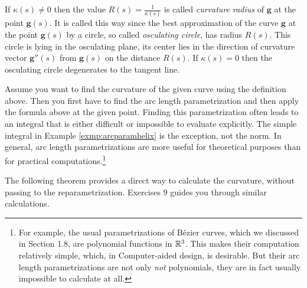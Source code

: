 If $\kappa(s)\ne 0$ then the value $R(s)=\tfrac1{\kappa(s)}$
is called \emph{curvature radius} of $\textbf{g}$ at the point $\textbf{g}(s)$. 
It is called this way since the best approximation of the curve $\textbf{g}$ at the point $\textbf{g}(s)$ by a circle, so called \emph{osculating circle}, has radius $R(s)$.
This circle is lying in the osculating plane,
its center lies in the direction of curvature vector $\textbf{g}''(s)$ from $\textbf{g}(s)$ on the distance $R(s)$.
If $\kappa(s)=0$ then the osculating circle degenerates to the tangent line.

Assume you want to find the curvature of the given curve using the definition above.
Then you first have to find the arc length parametrization and then apply the formula above at the given point.
Finding this parametrization often leads to an integral that is either difficult or impossible
to evaluate explicitly. 
The simple integral in Example \ref{exmp:arcparamhelix} is the exception, not the
norm. 
In general, arc length parametrizations are more useful for theoretical purposes than for practical
computations.\footnote{For example, the usual parametrizations of B\'{e}zier curves, which we discussed in Section 1.8,
are polynomial functions in $\mathbb{R}^{3}$. 
This makes their computation relatively simple, which, in Computer-aided design, is desirable.
But their arc length parametrizations are not only \emph{not} polynomials, they are in fact usually impossible to
calculate at all.}

The following theorem provides a direct way to calculate the curvature, without passing to the reparametrization.
Exercises 9 guides you through similar calculations.


